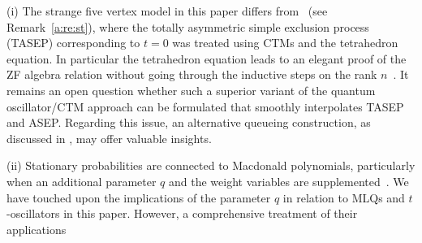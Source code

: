 \documentclass[11pt]{article}
\theoremstyle{definition}
\numberwithin{equation}{section}
\begin{document}
(i) The strange five vertex model in this paper differs from~\cite{KMO1,KMO2} 
(see Remark~\ref{a:re:st}), where 
the totally asymmetric simple exclusion process (TASEP) corresponding to $t=0$
was treated using CTMs and the tetrahedron equation.
In particular the tetrahedron equation leads to an elegant proof of the ZF algebra relation 
without going through the inductive steps on the rank $n$~\cite{KMO2,K22}.
It remains an open question whether such a superior variant of the quantum 
oscillator/CTM approach can be formulated that smoothly interpolates 
TASEP and ASEP.
Regarding this issue, an alternative queueing construction, 
as discussed in \cite[Sec.7]{Martin20}, may offer valuable insights.


(ii) Stationary probabilities are connected to Macdonald polynomials,
particularly when an additional parameter $q$ 
and the weight variables are supplemented~\cite{CDW,CMW,DW}.
We have touched upon the implications of the parameter $q$ 
in relation to MLQs and $t$-oscillators in this paper.
However, a comprehensive treatment of their applications 
\end{document}
